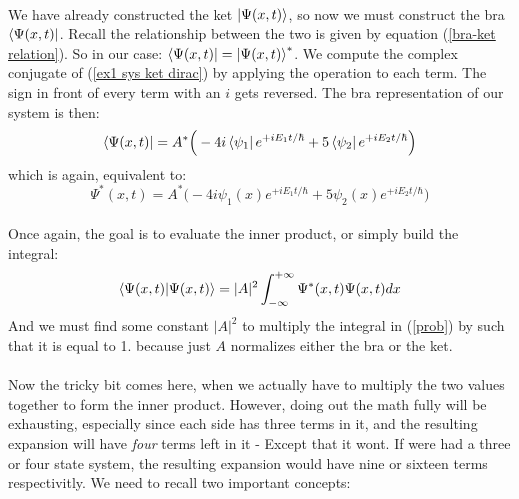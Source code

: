 \documentclass[12pt,letterpaper]{book}
\begin{document}
\paragraph*{}We have already constructed the ket $\ket{\Psi(x,t)}$, so now we must construct the bra $\bra{\Psi(x,t)}$. Recall the relationship between the two is given by equation (\ref{bra-ket relation}). So in our case: $\bra{\Psi(x,t)} = \ket{\Psi(x,t)}^*$. We compute the complex conjugate of (\ref{ex1 sys ket dirac}) by applying the operation to each term. The sign in front of every term with an $i$ gets reversed. The bra representation of our system is then:
\begin{equation}
\label{ex1 sys bra dirac}
\bra{\Psi(x,t)} = A^* \Big( - 4i \bra{\psi_1}e^{+iE_1t/\hbar} + 5 \bra{\psi_2} e^{+iE_2t/\hbar} \Big)
\end{equation}
which is again, equivalent to:
\begin{equation}
\label{ex1 sys non-dirac}
\Psi^*(x,t) = A^* \Big( - 4i \psi_1(x)e^{+iE_1t/\hbar} + 5 \psi_2(x) e^{+iE_2t/\hbar} \Big)
\end{equation}
\paragraph*{}Once again, the goal is to evaluate the inner product, or simply build the integral:
\begin{equation}
\label{prob}
\braket{\Psi(x,t)}{\Psi(x,t)} = |A|^2 \int_{-\infty}^{+\infty} \Psi^*(x,t)\Psi(x,t) dx
\end{equation}
And we must find some constant $|A|^2$ to multiply the integral in (\ref{prob}) by such that it is equal to 1. because just $A$ normalizes either the bra or the ket.
\paragraph*{}Now the tricky bit comes here, when we actually have to multiply the two values together to form the inner product. However, doing out the math fully will be exhausting, especially since each side has three terms in it, and the resulting expansion will have \textit{four} terms left in it - Except that it wont. If were had a three or four state system, the resulting expansion would have nine or sixteen terms respectivitly. We need to recall two important concepts:
\end{document}
